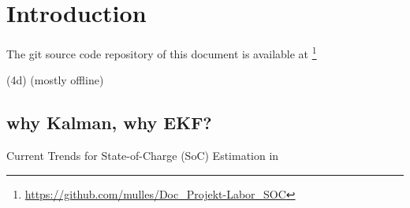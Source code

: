 

\chapter{Introduction}



The git source code repository of this document  \cite{Schons_Development_and_validation_2021} is available at \footnote{ \url{https://github.com/mulles/Doc_Projekt-Labor_SOC} }


(4d) (mostly offline)




\section{why Kalman, why EKF?}

\cite{espedal2021current}  Current Trends for State-of-Charge (SoC) Estimation in

